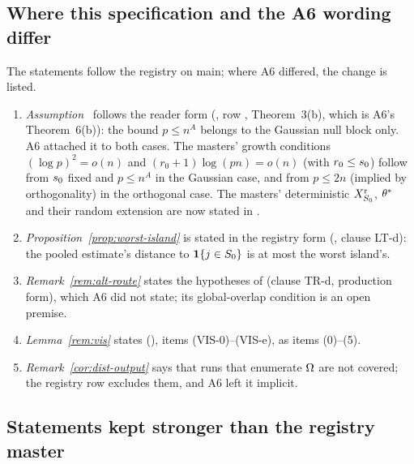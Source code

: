 \subsection{Where this specification and the A6 wording differ}

The statements follow the registry on main; where A6 differed, the change is listed.
\begin{enumerate}[label=\textbf{D\arabic*.},leftmargin=2.6em,itemsep=2pt]
  \item \emph{Assumption~} follows the reader form (, row ,
    Theorem~3(b), which is A6's Theorem~6(b)): the bound $p\le n^A$ belongs to the Gaussian null block only. A6 attached
    it to both cases. The masters' growth conditions $(\log p)^2=o(n)$ and $(r_0+1)\log(pn)=o(n)$ (with $r_0\le s_0$) follow from $s_0$ fixed
    and $p\le n^A$ in the Gaussian case, and from $p\le2n$ (implied by orthogonality) in the orthogonal case. The
    masters' deterministic $X^{\mathrm r}_{S_0}$, $\theta^*$ and their random extension are now stated in .
  \item \emph{Proposition~\ref{prop:worst-island}} is stated in the registry form (, clause LT-d): the
    pooled estimate's distance to $\mathbf{1}\{j\in S_0\}$ is at most the worst island's.
  \item \emph{Remark~\ref{rem:alt-route}} states the hypotheses of  (clause TR-d, production form), which
    A6 did not state; its global-overlap condition is an open premise.
  \item \emph{Lemma~\ref{rem:vis}} states  (), items (VIS-0)--(VIS-e), as
    items (0)--(5).
  \item \emph{Remark~\ref{cor:dist-output}} says that runs that enumerate $\Omega$ are not covered; the registry row excludes
    them, and A6 left it implicit.
\end{enumerate}

\subsection{Statements kept stronger than the registry master}

